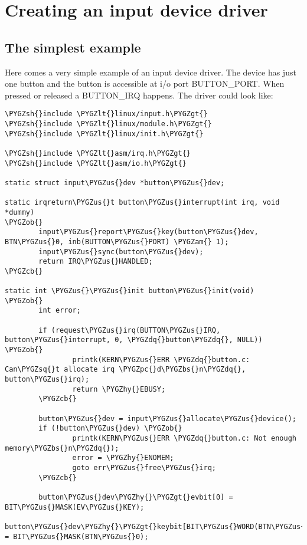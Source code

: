 \documentclass[a4paper,8pt,english]{sphinxmanual}
\def\PYGZbs{\char`\\}
\def\PYGZus{\char`\_}
\def\PYGZob{\char`\{}
\def\PYGZcb{\char`\}}
\def\PYGZam{\char`\&}
\def\PYGZlt{\char`\<}
\def\PYGZgt{\char`\>}
\def\PYGZsh{\char`\#}
\def\PYGZpc{\char`\%}
\def\PYGZhy{\char`\-}
\def\PYGZsq{\char`\'}
\def\PYGZdq{\char`\"}
\renewcommand\PYGZsq{\textquotesingle}
\begin{document}
\section{Creating an input device driver}
\label{input/input-programming::doc}\label{input/input-programming:creating-an-input-device-driver}

\subsection{The simplest example}
\label{input/input-programming:the-simplest-example}
Here comes a very simple example of an input device driver. The device has
just one button and the button is accessible at i/o port BUTTON\_PORT. When
pressed or released a BUTTON\_IRQ happens. The driver could look like:

\begin{Verbatim}[commandchars=\\\{\}]
\PYGZsh{}include \PYGZlt{}linux/input.h\PYGZgt{}
\PYGZsh{}include \PYGZlt{}linux/module.h\PYGZgt{}
\PYGZsh{}include \PYGZlt{}linux/init.h\PYGZgt{}

\PYGZsh{}include \PYGZlt{}asm/irq.h\PYGZgt{}
\PYGZsh{}include \PYGZlt{}asm/io.h\PYGZgt{}

static struct input\PYGZus{}dev *button\PYGZus{}dev;

static irqreturn\PYGZus{}t button\PYGZus{}interrupt(int irq, void *dummy)
\PYGZob{}
        input\PYGZus{}report\PYGZus{}key(button\PYGZus{}dev, BTN\PYGZus{}0, inb(BUTTON\PYGZus{}PORT) \PYGZam{} 1);
        input\PYGZus{}sync(button\PYGZus{}dev);
        return IRQ\PYGZus{}HANDLED;
\PYGZcb{}

static int \PYGZus{}\PYGZus{}init button\PYGZus{}init(void)
\PYGZob{}
        int error;

        if (request\PYGZus{}irq(BUTTON\PYGZus{}IRQ, button\PYGZus{}interrupt, 0, \PYGZdq{}button\PYGZdq{}, NULL)) \PYGZob{}
                printk(KERN\PYGZus{}ERR \PYGZdq{}button.c: Can\PYGZsq{}t allocate irq \PYGZpc{}d\PYGZbs{}n\PYGZdq{}, button\PYGZus{}irq);
                return \PYGZhy{}EBUSY;
        \PYGZcb{}

        button\PYGZus{}dev = input\PYGZus{}allocate\PYGZus{}device();
        if (!button\PYGZus{}dev) \PYGZob{}
                printk(KERN\PYGZus{}ERR \PYGZdq{}button.c: Not enough memory\PYGZbs{}n\PYGZdq{});
                error = \PYGZhy{}ENOMEM;
                goto err\PYGZus{}free\PYGZus{}irq;
        \PYGZcb{}

        button\PYGZus{}dev\PYGZhy{}\PYGZgt{}evbit[0] = BIT\PYGZus{}MASK(EV\PYGZus{}KEY);
        button\PYGZus{}dev\PYGZhy{}\PYGZgt{}keybit[BIT\PYGZus{}WORD(BTN\PYGZus{}0)] = BIT\PYGZus{}MASK(BTN\PYGZus{}0);


\end{Verbatim}
\end{document}
